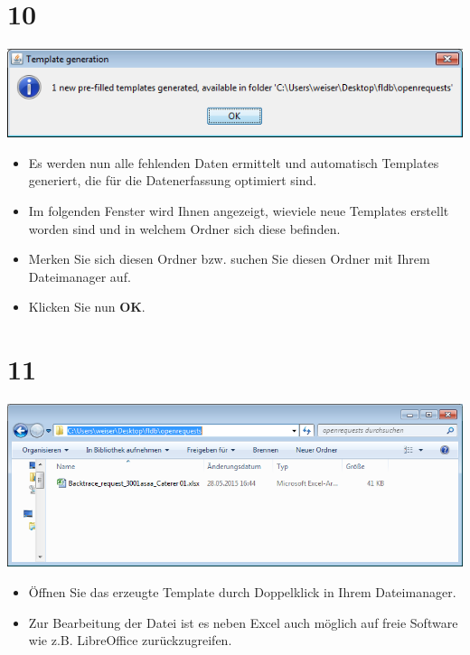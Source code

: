 \documentclass{beamer}
\begin{document}
\section{10}
\begin{frame}
	\begin{center}
  		\includegraphics[height=0.2\textheight]{10.png}
	\end{center}
	\begin{itemize}
		\item Es werden nun alle fehlenden Daten ermittelt und automatisch Templates generiert, die für die Datenerfassung optimiert sind.
		\item Im folgenden Fenster wird Ihnen angezeigt, wieviele neue Templates erstellt worden sind und in welchem Ordner sich diese befinden.
		\item Merken Sie sich diesen Ordner bzw. suchen Sie diesen Ordner mit Ihrem Dateimanager auf.
		\item Klicken Sie nun \textbf{OK}.
	\end{itemize}
\end{frame}

\section{11}
\begin{frame}
	\begin{center}
  		\includegraphics[height=0.4\textheight]{11.png}
	\end{center}
	\begin{itemize}
		\item Öffnen Sie das erzeugte Template durch Doppelklick in Ihrem Dateimanager.
		\item Zur Bearbeitung der Datei ist es neben Excel auch möglich auf freie Software wie z.B. LibreOffice zurückzugreifen.
	\end{itemize}
\end{frame}
\end{document}
